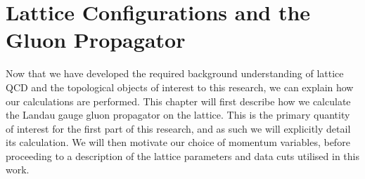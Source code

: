 
\chapter{Lattice Configurations and the Gluon Propagator}\label{chapter:GluonPropagator}
\ifpdf
    \graphicspath{{Chapter4/Figs/Raster/}{Chapter4/Figs/PDF/}{Chapter4/Figs/}}
\else
    \graphicspath{{Chapter4/Figs/Vector/}{Chapter4/Figs/}}
\fi

Now that we have developed the required background understanding of lattice QCD and the topological objects of interest to this research, we can explain how our calculations are performed. This chapter will first describe how we calculate the Landau gauge gluon propagator on the lattice. This is the primary quantity of interest for the first part of this research, and as such we will explicitly detail its calculation.  We will then motivate our choice of momentum variables, before proceeding to a description of the lattice parameters and data cuts utilised in this work.

